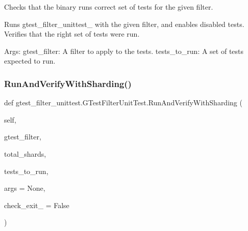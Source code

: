 \begin{DoxyVerb}Checks that the binary runs correct set of tests for the given filter.

Runs gtest_filter_unittest_ with the given filter, and enables
disabled tests. Verifies that the right set of tests were run.

Args:
  gtest_filter: A filter to apply to the tests.
  tests_to_run: A set of tests expected to run.
\end{DoxyVerb}
 \mbox{\label{classgtest__filter__unittest_1_1_g_test_filter_unit_test_a2022ed99e18a6e5afd1023b9dd19d6e0}} 
\subsubsection{\texorpdfstring{Run\+And\+Verify\+With\+Sharding()}{RunAndVerifyWithSharding()}}
{\footnotesize\ttfamily def gtest\+\_\+filter\+\_\+unittest.\+G\+Test\+Filter\+Unit\+Test.\+Run\+And\+Verify\+With\+Sharding (\begin{DoxyParamCaption}\item[{}]{self,  }\item[{}]{gtest\+\_\+filter,  }\item[{}]{total\+\_\+shards,  }\item[{}]{tests\+\_\+to\+\_\+run,  }\item[{}]{args = {\ttfamily None},  }\item[{}]{check\+\_\+exit\+\_ = {\ttfamily False} }\end{DoxyParamCaption})}

